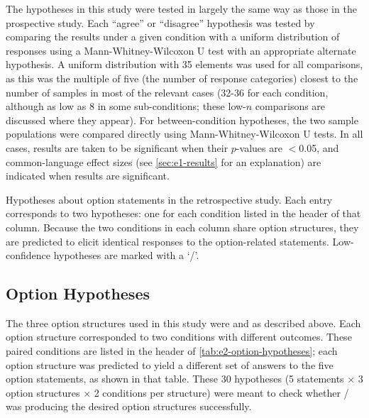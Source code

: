 The hypotheses in this study were tested in largely the same way as those in the prospective study.
%
Each ``agree'' or ``disagree'' hypothesis was tested by comparing the results under a given condition with a uniform distribution of responses using a Mann-Whitney-Wilcoxon U test with an appropriate alternate hypothesis.
%
A uniform distribution with 35 elements was used for all comparisons, as this was the multiple of five (the number of response categories) closest to the number of samples in most of the relevant cases (32-36 for each condition, although as low as 8 in some sub-conditions; these low-$n$ comparisons are discussed where they appear).
%
For between-condition hypotheses, the two sample populations were compared directly using Mann-Whitney-Wilcoxon U tests.
%
In all cases, results are taken to be significant when their $p$-values are $<$0.05, and common-language effect sizes (see \cref{sec:e1-results} for an explanation) are indicated when results are significant.


\begin{table}[!b]
\centering
\bgroup
\def\arraystretch{1.3}
\setlength{\tabcolsep}{0.6em}

\egroup
\caption[Retrospective option hypotheses]{Hypotheses about option statements in the retrospective study. Each entry corresponds to two hypotheses: one for each condition listed in the header of that column. Because the two conditions in each column share option structures, they are predicted to elicit identical responses to the option-related statements. Low-confidence hypotheses are marked with a `\lc/'.}
  \label{tab:e2-option-hypotheses}
\end{table}


\subsection{Option Hypotheses}


The three option structures used in this study were   and \obv{,} as described above.
%
Each option structure corresponded to two conditions with different outcomes.
%
These paired conditions are listed in the header of \cref{tab:e2-option-hypotheses}; each option structure was predicted to yield a different set of answers to the five option statements, as shown in that table.
%
These 30 hypotheses (5 statements $\times$ 3 option structures $\times$ 2 conditions per structure) were meant to check whether \dunyazad/ was producing the desired option structures successfully.


